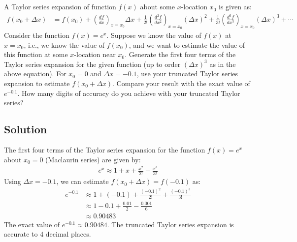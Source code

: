 \section{}
A Taylor series expansion of function $f(x)$ about some $x$-location $x_0$ is given as:
\begin{align*}
    f(x_0 + \Delta x) &= f(x_0) + \left(\frac{df}{dx}\right)_{x=x_0} \Delta x + \frac{1}{2!} \left(\frac{d^2f}{dx^2}\right)_{x=x_0} (\Delta x)^2 + \frac{1}{3!} \left(\frac{d^3f}{dx^3}\right)_{x=x_0} (\Delta x)^3 + \cdots
\end{align*}
Consider the function $f(x) = e^x$. Suppose we know the value of $f(x)$ at $x = x_0$, i.e., we know the value of $f(x_0)$, and we want to estimate the value of this function at some $x$-location near $x_0$. Generate the first four terms of the Taylor series expansion for the given function (up to order $(\Delta x)^3$ as in the above equation). For $x_0 = 0$ and $\Delta x = -0.1$, use your truncated Taylor series expansion to estimate $f(x_0 + \Delta x)$. Compare your result with the exact value of $e^{-0.1}$. How many digits of accuracy do you achieve with your truncated Taylor series?

\subsection*{Solution}
The first four terms of the Taylor series expansion for the function $f(x) = e^x$ about $x_0 = 0$ (Maclaurin series) are given by:
\begin{align*}
    e^{x} \approx 1 + x + \frac{x^2}{2!} + \frac{x^3}{3!}
\end{align*}
Using $\Delta x = -0.1$, we can estimate $f(x_0 + \Delta x) = f(-0.1)$ as:
\begin{align*}
    e^{-0.1} &\approx 1 + (-0.1) + \frac{(-0.1)^2}{2!} + \frac{(-0.1)^3}{3!} \\
    &\approx 1 - 0.1 + \frac{0.01}{2} - \frac{0.001}{6} \\
    &\approx \boxed{0.90483}
\end{align*}
The exact value of $e^{-0.1} \approx 0.90484$. The truncated Taylor series expansion is accurate to 4 decimal places.
